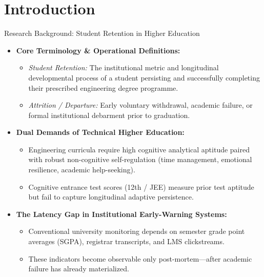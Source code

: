 \documentclass{beamer}
\begin{document}
\section{Introduction}

\begin{frame}[t]{Research Background: Student Retention in Higher Education}
  \begin{itemize}\setlength{\itemsep}{6pt}\small
    \item \textbf{Core Terminology \& Operational Definitions:}
    \begin{itemize}\setlength{\itemsep}{3pt}\footnotesize
      \item \textit{Student Retention:} The institutional metric and longitudinal developmental process of a student persisting and successfully completing their prescribed engineering degree programme.
      \item \textit{Attrition / Departure:} Early voluntary withdrawal, academic failure, or formal institutional debarment prior to graduation.
    \end{itemize}
    \item \textbf{Dual Demands of Technical Higher Education:}
    \begin{itemize}\setlength{\itemsep}{3pt}\footnotesize
      \item Engineering curricula require high cognitive analytical aptitude paired with robust non-cognitive self-regulation (time management, emotional resilience, academic help-seeking).
      \item Cognitive entrance test scores (12th / JEE) measure prior test aptitude but fail to capture longitudinal adaptive persistence.
    \end{itemize}
    \item \textbf{The Latency Gap in Institutional Early-Warning Systems:}
    \begin{itemize}\setlength{\itemsep}{3pt}\footnotesize
      \item Conventional university monitoring depends on semester grade point averages (SGPA), registrar transcripts, and LMS clickstreams.
      \item These indicators become observable only post-mortem---after academic failure has already materialized.
    \end{itemize}
  \end{itemize}
\end{frame}
\end{document}
